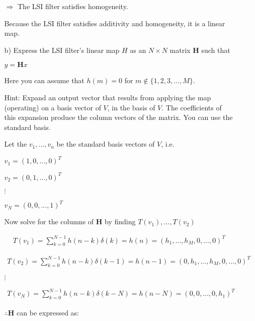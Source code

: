 \documentclass[fleqn]{article}
\begin{document}
\begin{enumerate}[nolistsep]
\begin{enumerate}
			$\Rightarrow$ The LSI filter satisfies homogeneity.
			
			Because the LSI filter satisfies additivity and homogeneity, it is a linear map.
			
			\pagebreak
			\item[b)] Express the LSI filter's linear map $H$ as an $N \times N$ matrix $\mathbf{H}$ such that
			
			\begin{center}
				$y = \mathbf{H}x$
			\end{center}
			
			Here you can assume that $h(m) = 0$ for $m \not\in \{1,2,3,...,M\}$.
			
			Hint: Expand an output vector that results from applying the map (operating) on a basis vector of $V$, in the basis of $V$. The coefficients of this expansion produce the column vectors of the matrix. You can use the standard basis.

			Let the $v_1,...,v_n$ be the standard basis vectors of $V$, i.e.
			
			$v_1 = (1, 0,...,0)^T$
			
			$v_2 = (0, 1,...,0)^T$
			
			$\vdots$
			
			$v_N = (0, 0,...,1)^T$
			
			Now solve for the columns of $\mathbf{H}$ by finding $T(v_1),...,T(v_2)$
			
			\begin{align*}
				T(v_1) = \sum_{k=0}^{N-1}{h(n-k)\delta(k)} = h(n) = (h_1,...,h_M,0,...,0)^T
			\end{align*}
			
			\begin{align*}
				T(v_2) = \sum_{k=0}^{N-1}{h(n-k)\delta(k-1)} = h(n-1) = (0, h_1,...,h_M,0,...,0)^T
			\end{align*}
			
			$\vdots$
			
			\begin{align*}
				T(v_N) = \sum_{k=0}^{N-1}{h(n-k)\delta(k-N)} = h(n-N) = (0, 0,...,0,h_1)^T
			\end{align*}
			
			\newpage
			$\therefore \mathbf{H}$ can be expressed as:
			

\end{enumerate}
\end{enumerate}
\end{document}
